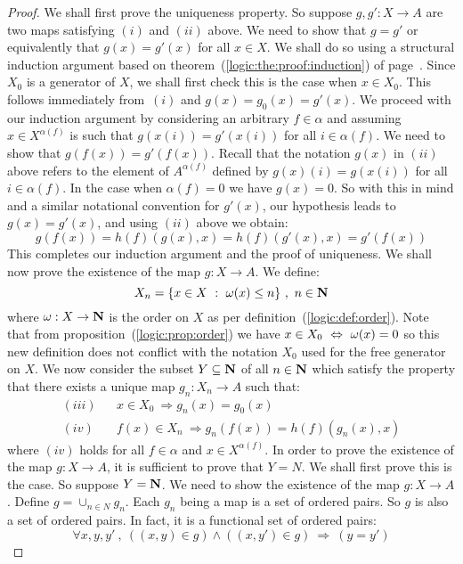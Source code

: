 \begin{proof}
We shall first prove the uniqueness property. So suppose $g,g':X\to
A$ are two maps satisfying $(i)$ and $(ii)$ above. We need to show
that $g=g'$ or equivalently that $g(x)=g'(x)$ for all $x\in X$. We
shall do so using a structural induction argument based on
theorem~(\ref{logic:the:proof:induction}) of
page~\pageref{logic:the:proof:induction}. Since $X_{0}$ is a
generator of $X$, we shall first check this is the case when $x\in
X_{0}$. This follows immediately from~$(i)$ and
$g(x)=g_{0}(x)=g'(x)$. We proceed with our induction argument by
considering an arbitrary $f\in\alpha$ and assuming $x\in
X^{\alpha(f)}$ is such that $g(x(i))=g'(x(i))$ for all
$i\in\alpha(f)$. We need to show that $g(f(x))=g'(f(x))$. Recall
that the notation $g(x)$ in $(ii)$ above refers to the element of
$A^{\alpha(f)}$ defined by $g(x)(i)=g(x(i))$ for all
$i\in\alpha(f)$. In the case when $\alpha(f)=0$ we have $g(x)=0$. So
with this in mind and a similar notational convention for $g'(x)$,
our hypothesis leads to $g(x)=g'(x)$, and using $(ii)$ above we
obtain:
    \[
    g(f(x))=h(f)(g(x),x)=h(f)(g'(x),x)=g'(f(x))
    \]
This completes our induction argument and the proof of uniqueness.
We shall now prove the existence of the map $g:X\to A$. We define:
    \[
    X_{n}=\{x\in X\ :\ \mbox{$\omega$}(x)\leq n\}\ ,\ n\in\mbox{$\bf N$}
    \]
where $\mbox{$\omega$}:X\to\mbox{$\bf N$}$ is the order on $X$ as per
definition~(\ref{logic:def:order}). Note that from
proposition~(\ref{logic:prop:order}) we have $x\in X_{0}\
\Leftrightarrow\ \mbox{$\omega$}(x)=0$ so this new definition does not conflict
with the notation $X_{0}$ used for the free generator on $X$. We now
consider the subset $Y\subseteq\mbox{$\bf N$}$ of all $n\in\mbox{$\bf N$}$ which satisfy the
property that there exists a unique map $g_{n}:X_{n}\to A$ such
that:
    \begin{eqnarray*}
    (iii)&& x\in X_{0}\ \Rightarrow g_{n}(x)=g_{0}(x)\\
    (iv)&& f(x)\in X_{n}\ \Rightarrow g_{n}(f(x)) = h(f)(g_{n}(x),x)
    \end{eqnarray*}
where $(iv)$ holds for all $f\in\alpha$ and $x\in X^{\alpha(f)}$. In
order to prove the existence of the map $g:X\to A$, it is sufficient
to prove that $Y=N$. We shall first prove this is the case. So
suppose $Y=\mbox{$\bf N$}$. We need to show the existence of the map $g:X\to A$.
Define $g=\cup_{n\in N}g_{n}$. Each $g_{n}$ being a map is a set of
ordered pairs. So $g$ is also a set of ordered pairs. In fact, it is
a functional set of ordered pairs:
    \[
    \forall x,y,y'\ ,\ ((x,y)\in g)\land((x,y')\in g)\ \Rightarrow\
    (y=y')
\]
\end{proof}
